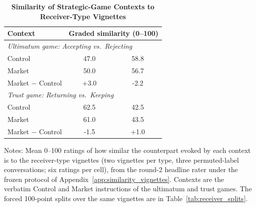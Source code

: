\begin{table}[!htbp]
\centering
\footnotesize
\renewcommand{\arraystretch}{1.15}
\caption{\textbf{Similarity of Strategic-Game Contexts to Receiver-Type Vignettes}}
\label{tab:similarity_receivers}
\begin{tabular}{l cc}
\toprule
Context & \multicolumn{2}{c}{Graded similarity (0--100)} \\
\midrule
\multicolumn{3}{l}{\emph{Ultimatum game: Accepting vs.\ Rejecting}} \\
Control & 47.0 & 58.8 \\
Market & 50.0 & 56.7 \\
Market $-$ Control & +3.0 & -2.2 \\
\midrule
\multicolumn{3}{l}{\emph{Trust game: Returning vs.\ Keeping}} \\
Control & 62.5 & 42.5 \\
Market & 61.0 & 43.5 \\
Market $-$ Control & -1.5 & +1.0 \\
\bottomrule
\end{tabular}
\begin{flushleft}
\footnotesize Notes: Mean 0--100 ratings of how similar the counterpart evoked by each context is to the receiver-type vignettes (two vignettes per type, three permuted-label conversations; six ratings per cell), from the round-2 headline rater under the frozen protocol of Appendix~\ref{app:similarity_vignettes}. Contexts are the verbatim Control and Market instructions of the ultimatum and trust games. The forced 100-point splits over the same vignettes are in Table~\ref{tab:receiver_splits}.
\end{flushleft}
\end{table}

